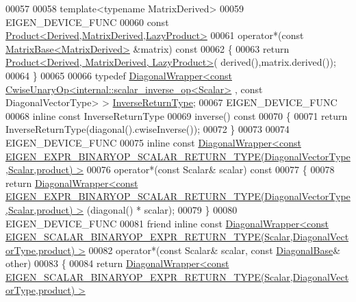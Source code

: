 \begin{DoxyCode}
00057 
00058     \textcolor{keyword}{template}<\textcolor{keyword}{typename} MatrixDerived>
00059     EIGEN\_DEVICE\_FUNC
00060     \textcolor{keyword}{const} \hyperlink{group___core___module_class_eigen_1_1_product}{Product<Derived,MatrixDerived,LazyProduct>}
00061     operator*(\textcolor{keyword}{const} \hyperlink{group___core___module_class_eigen_1_1_matrix_base}{MatrixBase<MatrixDerived>} &matrix)\textcolor{keyword}{ const}
00062 \textcolor{keyword}{    }\{
00063       \textcolor{keywordflow}{return} \hyperlink{group___core___module_class_eigen_1_1_product}{Product<Derived, MatrixDerived, LazyProduct>}(
      derived(),matrix.derived());
00064     \}
00065 
00066     \textcolor{keyword}{typedef} 
      \hyperlink{group___core___module_class_eigen_1_1_diagonal_wrapper}{DiagonalWrapper<const CwiseUnaryOp<internal::scalar\_inverse\_op<Scalar>}
      , \textcolor{keyword}{const} DiagonalVectorType> > \hyperlink{group___core___module_class_eigen_1_1_diagonal_wrapper}{InverseReturnType};
00067     EIGEN\_DEVICE\_FUNC
00068     \textcolor{keyword}{inline} \textcolor{keyword}{const} InverseReturnType
00069     inverse()\textcolor{keyword}{ const}
00070 \textcolor{keyword}{    }\{
00071       \textcolor{keywordflow}{return} InverseReturnType(diagonal().cwiseInverse());
00072     \}
00073     
00074     EIGEN\_DEVICE\_FUNC
00075     \textcolor{keyword}{inline} \textcolor{keyword}{const} 
      \hyperlink{group___core___module_class_eigen_1_1_diagonal_wrapper}{DiagonalWrapper<const EIGEN\_EXPR\_BINARYOP\_SCALAR\_RETURN\_TYPE(DiagonalVectorType,Scalar,product) >}
00076     operator*(\textcolor{keyword}{const} Scalar& scalar)\textcolor{keyword}{ const}
00077 \textcolor{keyword}{    }\{
00078       \textcolor{keywordflow}{return} 
      \hyperlink{group___core___module_class_eigen_1_1_diagonal_wrapper}{DiagonalWrapper<const EIGEN\_EXPR\_BINARYOP\_SCALAR\_RETURN\_TYPE(DiagonalVectorType,Scalar,product) >}
      (diagonal() * scalar);
00079     \}
00080     EIGEN\_DEVICE\_FUNC
00081     \textcolor{keyword}{friend} \textcolor{keyword}{inline} \textcolor{keyword}{const} 
      \hyperlink{group___core___module_class_eigen_1_1_diagonal_wrapper}{DiagonalWrapper<const EIGEN\_SCALAR\_BINARYOP\_EXPR\_RETURN\_TYPE(Scalar,DiagonalVectorType,product) >}
00082     operator*(\textcolor{keyword}{const} Scalar& scalar, \textcolor{keyword}{const} \hyperlink{class_eigen_1_1_diagonal_base}{DiagonalBase}& other)
00083     \{
00084       \textcolor{keywordflow}{return} 
      \hyperlink{group___core___module_class_eigen_1_1_diagonal_wrapper}{DiagonalWrapper<const EIGEN\_SCALAR\_BINARYOP\_EXPR\_RETURN\_TYPE(Scalar,DiagonalVectorType,product) >}

\end{DoxyCode}
